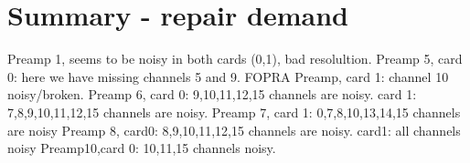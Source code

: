 \documentclass{report}
\begin{document}
\newpage
\clearpage

\section{Summary - repair demand}
Preamp 1, seems to be noisy in both cards (0,1), bad resolultion.\newline
Preamp 5, card 0: here we have missing channels 5 and 9.\newline
FOPRA Preamp, card 1: channel 10 noisy/broken.\newline
Preamp 6, card 0: 9,10,11,12,15 channels are noisy. card 1: 7,8,9,10,11,12,15 channels are noisy.\newline
Preamp 7, card 1: 0,7,8,10,13,14,15 channels are noisy\newline
Preamp 8, card0: 8,9,10,11,12,15 channels are noisy. card1: all channels noisy\newline
Preamp10,card 0: 10,11,15 channels noisy.\newline
\end{document}
